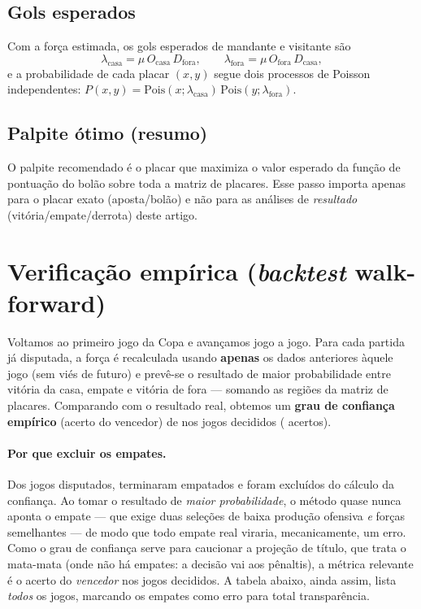 \documentclass[11pt,a4paper]{article}
\begin{document}
\subsection{Gols esperados}
Com a for\c{c}a estimada, os gols esperados de mandante e visitante s\~ao
\begin{equation}
\lambda_{\text{casa}} = \mu\,O_{\text{casa}}\,D_{\text{fora}}, \qquad
\lambda_{\text{fora}} = \mu\,O_{\text{fora}}\,D_{\text{casa}},
\end{equation}
e a probabilidade de cada placar $(x,y)$ segue dois processos de Poisson
independentes: $P(x,y) = \mathrm{Pois}(x;\lambda_{\text{casa}})\,
\mathrm{Pois}(y;\lambda_{\text{fora}})$.

\subsection{Palpite \'otimo (resumo)}
O palpite recomendado \'e o placar que maximiza o valor esperado da fun\c{c}\~ao
de pontua\c{c}\~ao do bol\~ao sobre toda a matriz de placares. Esse passo
importa apenas para o placar exato (aposta/bol\~ao) e n\~ao para as an\'alises
de \emph{resultado} (vit\'oria/empate/derrota) deste artigo.

\section{Verifica\c{c}\~ao emp\'irica (\emph{backtest} walk-forward)}
Voltamos ao primeiro jogo da Copa e avan\c{c}amos jogo a jogo. Para cada partida
j\'a disputada, a for\c{c}a \'e recalculada usando \textbf{apenas} os dados
anteriores \`aquele jogo (sem vi\'es de futuro) e prev\^e-se o resultado de maior
probabilidade entre vit\'oria da casa, empate e vit\'oria de fora — somando as
regi\~oes da matriz de placares. Comparando com o resultado real, obtemos um
\textbf{grau de confian\c{c}a emp\'irico} (acerto do vencedor) de
\textbf{\grauConfianca} nos \nDecididos{} jogos decididos (\nAcertos{} acertos).

\paragraph{Por que excluir os empates.} Dos \nJogosBacktest{} jogos disputados,
\nEmpatesExcluidos{} terminaram empatados e foram exclu\'idos do c\'alculo da
confian\c{c}a. Ao tomar o resultado de \emph{maior probabilidade}, o m\'etodo
quase nunca aponta o empate — que exige duas sele\c{c}\~oes de baixa produ\c{c}\~ao
ofensiva \emph{e} for\c{c}as semelhantes — de modo que todo empate real viraria,
mecanicamente, um erro. Como o grau de confian\c{c}a serve para caucionar a
proje\c{c}\~ao de t\'itulo, que trata o mata-mata (onde n\~ao h\'a empates: a
decis\~ao vai aos p\^enaltis), a m\'etrica relevante \'e o acerto do
\emph{vencedor} nos jogos decididos. A tabela abaixo, ainda assim, lista
\emph{todos} os jogos, marcando os empates como erro para total transpar\^encia.
\end{document}
